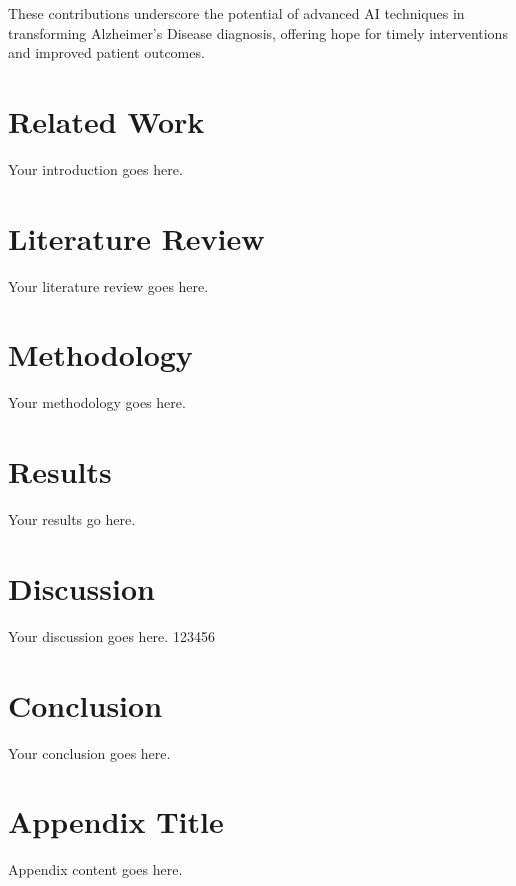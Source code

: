 \documentclass[10pt,twocolumn]{report}
\begin{document}
These contributions underscore the potential of advanced AI techniques in transforming Alzheimer’s Disease diagnosis, offering hope for timely interventions and improved patient outcomes.

\chapter{Related Work}
Your introduction goes here.

\chapter{Literature Review}
Your literature review goes here.

\chapter{Methodology}
Your methodology goes here.

\chapter{Results}
Your results go here.

\chapter{Discussion}
Your discussion goes here. 123456

\chapter{Conclusion}
Your conclusion goes here.

\appendix
\chapter{Appendix Title}
Appendix content goes here.

\cleardoublepage
\printbibliography
\end{document}
